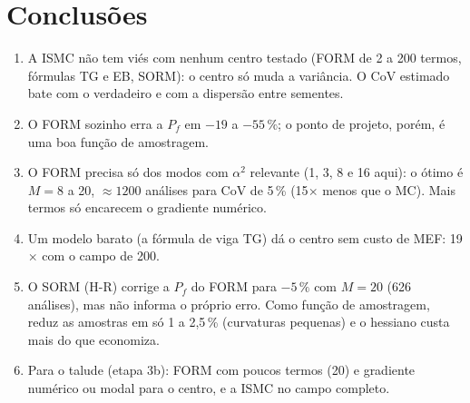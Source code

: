 \documentclass[11pt,a4paper]{article}
\begin{document}
\section{Conclusões}
\begin{enumerate}
  \item A ISMC não tem viés com nenhum centro testado (FORM de 2 a 200 termos, fórmulas TG e EB, SORM): o centro só muda
    a variância. O CoV estimado bate com o verdadeiro e com a dispersão entre sementes.
  \item O FORM sozinho erra a $P_f$ em $-19$ a $-55\,\%$; o ponto de projeto, porém, é uma boa função de amostragem.
  \item O FORM precisa só dos modos com $\alpha^2$ relevante (1, 3, 8 e 16 aqui): o ótimo é $M = 8$ a 20, $\approx 1200$
    análises para CoV de 5\,\% (15$\times$ menos que o MC). Mais termos só encarecem o gradiente numérico.
  \item Um modelo barato (a fórmula de viga TG) dá o centro sem custo de MEF: 19$\times$ com o campo de 200.
  \item O SORM (H-R) corrige a $P_f$ do FORM para $-5\,\%$ com $M = 20$ (626 análises), mas não informa o próprio erro.
    Como função de amostragem, reduz as amostras em só 1 a 2,5\,\% (curvaturas pequenas) e o hessiano custa mais do que
    economiza.
  \item Para o talude (etapa 3b): FORM com poucos termos (20) e gradiente numérico ou modal para o centro, e a ISMC no
    campo completo.
\end{enumerate}
\end{document}

